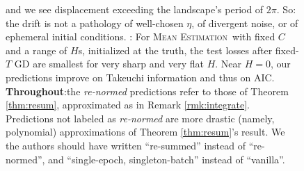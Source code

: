 \documentclass{article}
\newcommand{\ofsix}[1]{
    {\tiny \raisebox{0.04cm}{$\substack{
        \ifthenelse{\equal{#1}{0}}{{\color{moor}\blacksquare}}{\square}
        \ifthenelse{\equal{#1}{2}}{{\color{moor}\blacksquare}}{\square}    
        \ifthenelse{\equal{#1}{4}}{{\color{moor}\blacksquare}}{\square} \\
        \ifthenelse{\equal{#1}{1}}{{\color{moor}\blacksquare}}{\square}    
        \ifthenelse{\equal{#1}{3}}{{\color{moor}\blacksquare}}{\square}
        \ifthenelse{\equal{#1}{5}}{{\color{moor}\blacksquare}}{\square}
    }$}}%
}
\theoremstyle{plain}
\theoremstyle{definition}
\newcommand{\MeanEstimation}{\textsc{Mean Estimation}}
\begin{document}
\begin{figure}[h!]
{                and we see displacement exceeding the landscape's period of
                $2\pi$.  So: the drift is not a pathology of well-chosen
                $\eta$, of divergent noise, or of ephemeral initial conditions.
                \protect\ofsix{5}: For \MeanEstimation\, with fixed $C$ and a
                range of $H$s, initialized at the truth, the test losses after
                fixed-$T$ GD are smallest for very sharp and very flat $H$.
                Near $H=0$, our predictions improve on Takeuchi information
                \citep{di18} and thus on AIC.
                \newline
                \textbf{Throughout}:the \emph{re-normed} predictions refer to
                those of Theorem \ref{thm:resum}, approximated as in Remark
                \ref{rmk:integrate}.  Predictions not labeled as
                \emph{re-normed} are more drastic (namely, polynomial)
                approximations of Theorem \ref{thm:resum}'s result.
                We the authors should have written ``re-summed'' instead of
                ``re-normed'', and ``single-epoch, singleton-batch'' instead of
                ``vanilla''.
            }
            \label{fig:vanilla}
        \end{figure}


\end{document}
